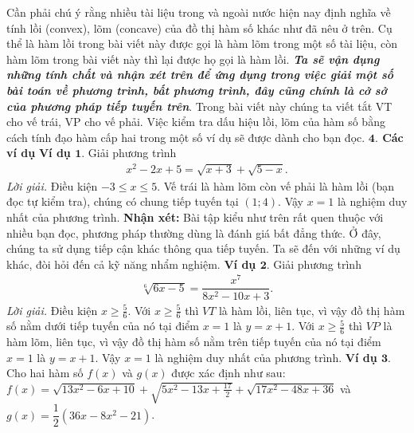 \begin{multicols}{2}
\begin{center}
	\end{center}
	Cần phải chú ý rằng nhiều tài liệu trong và ngoài nước hiện nay định nghĩa về tính lồi (convex), lõm (concave) của đồ thị hàm số khác như đã nêu ở trên. Cụ thể là hàm lồi trong bài viết này được gọi là hàm lõm trong một số tài liệu, còn hàm lõm trong bài viết này thì lại được họ gọi là hàm lồi. 
	\vskip 0.1cm
	\textit{\textbf{\color{diendantoanhoc}Ta sẽ vận dụng những tính chất và nhận xét trên để ứng dụng trong việc giải một số bài toán về phương trình, bất phương trình, đây cũng chính là cở sở của phương pháp tiếp tuyến trên}}.
	\vskip 0.1cm
	Trong bài viết này chúng ta viết tắt VT cho vế trái, VP cho vế phải.
	Việc kiểm tra dấu hiệu lồi, lõm của hàm số bằng cách tính đạo hàm cấp hai trong một số ví dụ sẽ được dành cho bạn đọc.
	\vskip 0.1cm
	\textbf{\color{diendantoanhoc}$\pmb{4.}$ Các ví dụ}
	\vskip 0.1cm
	\textbf{\color{diendantoanhoc}Ví dụ $\pmb{1.}$} Giải phương trình
	\begin{align*}
		x^2-2x+5=\sqrt{x+3}+\sqrt{5-x}.
	\end{align*}
	\textit{Lời giải.} Điều kiện $-3\leq x\leq 5$. Vế trái là hàm lõm còn vế phải là hàm lồi (bạn đọc tự kiểm tra), chúng có chung tiếp tuyến tại $(1;4)$. Vậy $x=1$ là nghiệm duy nhất của phương trình.
	\vskip 0.1cm
	\textbf{\color{diendantoanhoc}Nhận xét:} Bài tập kiểu như trên rất quen thuộc với nhiều bạn đọc, phương pháp thường dùng là đánh giá bất đẳng thức. Ở đây, chúng ta sử dụng tiếp cận khác thông qua tiếp tuyến.
	\vskip 0.1cm
	Ta sẽ đến với những ví dụ khác, đòi hỏi đến cả kỹ năng nhẩm nghiệm.
	\vskip 0.1cm
	\textbf{\color{diendantoanhoc}Ví dụ $\pmb{2.}$} Giải phương trình
	\begin{align*}
		\sqrt[6]{6x-5}=\dfrac{x^{7}}{8x^{2}-10x+3}.
	\end{align*}
	\textit{Lời giải.} Điều kiện $x\ge \frac{5}{6}$. Với $x\ge \frac{5}{6}$ thì $VT$ là hàm lồi, liên tục, vì vậy đồ thị hàm số nằm dưới tiếp tuyến của nó tại điểm $x=1$ là $y=x+1$.
	Với $x\ge\frac{5}{6}$ thì $VP$ là hàm lõm, liên tục, vì vậy đồ thị hàm số nằm trên tiếp tuyến của nó tại điểm $x=1$ là $y=x+1$.
	\vskip 0.1cm
	Vậy $x=1$ là nghiệm duy nhất của phương trình. 
	\vskip 0.1cm
	\textbf{\color{diendantoanhoc}Ví dụ $\pmb{3.}$} Cho hai hàm số $f(x)$ và $g(x)$ được xác định như sau: $f(x)=\sqrt{13x^{2} - 6x + 10 } + \sqrt{5x^{2} -13x + \frac{17}{2}} + \sqrt{17x^{2} - 48x + 36} $ và $g(x)= \dfrac{1}{2}(36x - 8x^{2} - 21)$.

\end{multicols}
